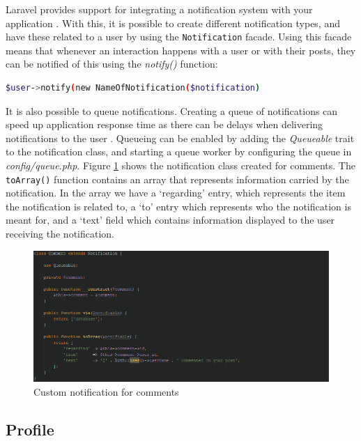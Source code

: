 Laravel provides support for integrating a notification system with your application \cite{Laravel:Notifications}. With this, it is possible to create different notification types, and have these related to a user by using the \texttt{Notification} facade. Using this facade means that whenever an interaction happens with a user or with their posts, they can be notified of this using the \textit{notify()} function:

\begin{lstlisting}[language=bash]
	$user->notify(new NameOfNotification($notification)
\end{lstlisting}

 It is also possible to queue notifications. Creating a queue of notifications can speed up application response time as there can be delays when delivering notifications to the user \cite{Laravel:Notifications, Laravel:Queues}. Queueing can be enabled by adding the \textit{Queueable} trait to the notification class, and starting a queue worker by configuring the queue in \textit{config/queue.php}. Figure \ref{fig:CommentNotification} shows the notification class created for comments. The \texttt{toArray()} function contains an array that represents information carried by the notification. In the array we have a `regarding' entry, which represents the item the notification is related to, a `to' entry which represents who the notification is meant for, and a `text' field which contains information displayed to the user receiving the notification.

\begin{figure}[H]
\centering
\includegraphics[width=\textwidth]{Images/Implementation/CommentNotification}
\caption{Custom notification for comments}
\label{fig:CommentNotification}
\end{figure}

\subsection{Profile}
